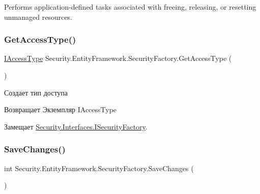 Performs application-\/defined tasks associated with freeing, releasing, or resetting unmanaged resources. 

\mbox{\label{class_security_1_1_entity_framework_1_1_security_factory_ad96cae2f018cdbb3245b2c00c0f37db2}} 
\subsubsection{\texorpdfstring{Get\+Access\+Type()}{GetAccessType()}}
{\footnotesize\ttfamily \hyperlink{interface_security_1_1_interfaces_1_1_model_1_1_i_access_type}{I\+Access\+Type} Security.\+Entity\+Framework.\+Security\+Factory.\+Get\+Access\+Type (\begin{DoxyParamCaption}{ }\end{DoxyParamCaption})}



Создает тип доступа 

\begin{DoxyReturn}{Возвращает}
Экземпляр I\+Access\+Type
\end{DoxyReturn}


Замещает \hyperlink{interface_security_1_1_interfaces_1_1_i_security_factory_a0e9cedfa313829d1f3d74b5c439ad285}{Security.\+Interfaces.\+I\+Security\+Factory}.

\mbox{\label{class_security_1_1_entity_framework_1_1_security_factory_a638532b6e8fd71f5f82170abee4ae433}} 
\subsubsection{\texorpdfstring{Save\+Changes()}{SaveChanges()}}
{\footnotesize\ttfamily int Security.\+Entity\+Framework.\+Security\+Factory.\+Save\+Changes (\begin{DoxyParamCaption}{ }\end{DoxyParamCaption})}



